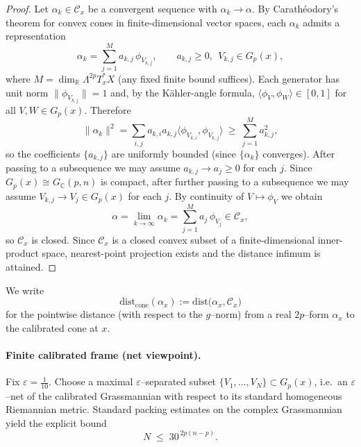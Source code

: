 \documentclass[11pt]{article}
\newcommand{\REVMZ}[1]{\textcolor{teal}{#1}}  %
\numberwithin{equation}{section}  %
\theoremstyle{plain}
\theoremstyle{definition}
\theoremstyle{remark}
\newcommand{\R}{\mathbb{R}}
\newcommand{\C}{\mathbb{C}}
\newcommand{\dist}{\mathrm{dist}}
\newcommand{\cone}{\mathrm{cone}}
\newcommand{\distcone}{\dist_{\cone}}        %
\newcommand{\Gp}{G_p}
\begin{document}
\begin{proof}
Let $\alpha_k\in\mathcal{C}_x$ be a convergent sequence with $\alpha_k\to \alpha$.
By Carath\'eodory's theorem \REVMZ{\cite{Schneider14}} for convex cones in finite-dimensional vector spaces, each $\alpha_k$ admits a representation
\[
\alpha_k=\sum_{j=1}^{M} a_{k,j}\,\phi_{V_{k,j}},
\qquad a_{k,j}\ge 0,\ \ V_{k,j}\in \Gp(x),
\]
where $M=\dim_{\R}\Lambda^{2p}T_x^*X$ (any fixed finite bound suffices).
Each generator has unit norm $\|\phi_{V_{k,j}}\|=1$ and, by the K\"ahler-angle formula,
$\langle \phi_{V},\phi_{W}\rangle\in[0,1]$ for all $V,W\in\Gp(x)$.
Therefore
\[
\|\alpha_k\|^2
=\sum_{i,j}a_{k,i}a_{k,j}\langle\phi_{V_{k,i}},\phi_{V_{k,j}}\rangle
\ \ge\ \sum_{j=1}^{M} a_{k,j}^2,
\]
so the coefficients $\{a_{k,j}\}$ are uniformly bounded (since $\{\alpha_k\}$ converges).
After passing to a subsequence we may assume $a_{k,j}\to a_j\ge 0$ for each $j$.
Since $\Gp(x)\cong G_{\C}(p,n)$ is compact, after further passing to a subsequence we may assume
$V_{k,j}\to V_j\in\Gp(x)$ for each $j$.
By continuity of $V\mapsto \phi_V$ we obtain
\[
\alpha=\lim_{k\to\infty}\alpha_k
=\sum_{j=1}^{M} a_j\,\phi_{V_j}\in\mathcal{C}_x,
\]
so $\mathcal{C}_x$ is closed.  Since $\mathcal{C}_x$ is a closed convex subset of a finite-dimensional inner-product space,
nearest-point projection exists and the distance infimum is attained.
\end{proof}


We write
\[
\distcone(\alpha_{x})
:=
\dist\!\bigl(\alpha_{x},\mathcal{C}_{x}\bigr)
\]
for the pointwise distance (with respect to the $g$--norm) from a real
$2p$--form $\alpha_{x}$ to the calibrated cone at $x$.

\paragraph{Finite calibrated frame (net viewpoint).}
Fix $\varepsilon = \tfrac{1}{10}$.
Choose a maximal $\varepsilon$--separated subset 
$\{V_{1},\ldots,V_{N}\}\subset \Gp(x)$, i.e.\ an $\varepsilon$--net
of the calibrated Grassmannian with respect to its standard homogeneous
Riemannian metric.  
Standard packing estimates on the complex Grassmannian yield the explicit
bound
\[
N \;\le\; 30^{\,2p(n-p)}.
\]
\end{document}
